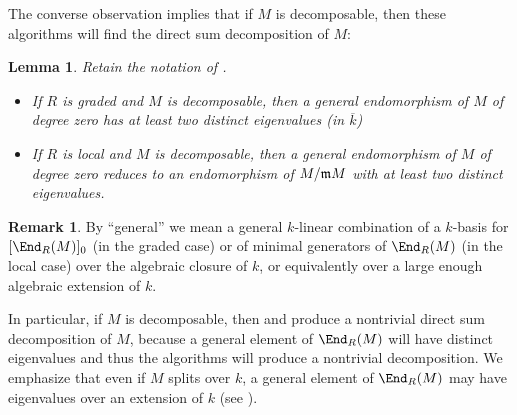\documentclass[12pt]{article}
\let\bar\overline
\theoremstyle{theorem}
\numberwithin{thm}{section}
\newtheorem{lem}[thm]{Lemma}
\theoremstyle{definition}
\newtheorem{rem}[thm]{Remark}
\begin{document}
The converse observation implies that if $M$ is decomposable, then these algorithms will find the direct sum decomposition of $M$:

\begin{lem}\label{lem:distinct}
  Retain the notation of .
  \begin{itemize}
  \item If $R$ is graded and $M$ is decomposable, then a general endomorphism of $M$ of degree zero has at least two distinct eigenvalues (in $\bar k$)
  \item If $R$ is local and $M$ is decomposable, then a general endomorphism of $M$ of degree zero reduces to an endomorphism of $M/\mathfrak m M$ with at least two distinct eigenvalues.
  \end{itemize}
\end{lem}

\begin{rem}\label{rem:general}
  By ``general'' we mean a general $k$-linear combination of a $k$-basis for $[\End_R(M)]_0$ (in the graded case) or of minimal generators of $\End_R(M)$ (in the local case) over the algebraic closure of $k$, or equivalently over a large enough algebraic extension of $k$.
\end{rem}

In particular, if $M$ is decomposable, then  and  produce a nontrivial direct sum decomposition of $M$, because a general element of $\End_R(M)$ will have distinct eigenvalues and thus the algorithms will produce a nontrivial decomposition. We emphasize that even if $M$ splits over $k$, a general element of $\End_R(M)$ may have eigenvalues over an extension of $k$ (see ).
\end{document}
